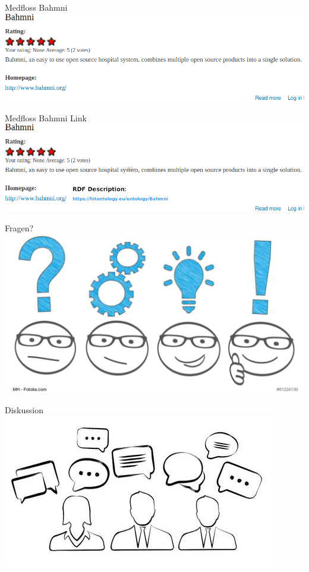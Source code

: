 \documentclass[aspectratio=1610,12pt]{beamer}
\begin{document}
\begin{frame}{Medfloss Bahmni}
  \includegraphics[width=\textwidth]{img/medfloss-bahmni.png}
\end{frame}

\begin{frame}{Medfloss Bahmni Link}
  \includegraphics[width=\textwidth]{img/medfloss-bahmni-link.png}
\end{frame}

\begin{frame}{Fragen?}
  \centering
  \vspace{-0.5cm}
  \includegraphics[width=\textwidth]{img/fragen.png}
\end{frame}

\begin{frame}{Diskussion}
  \centering
  \vspace{-0.5cm}
  \includegraphics[width=\textwidth]{img/discussion.png}
\end{frame}
\end{document}
